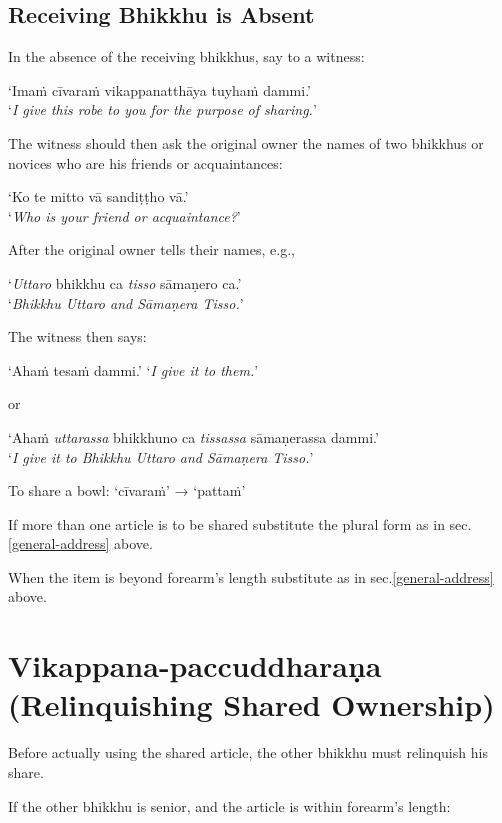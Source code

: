 
\subsection{Receiving Bhikkhu is Absent}
\label{receiving-bhikkhu-absent}

In the absence of the receiving bhikkhus, say to a witness:

‘Imaṁ cīvaraṁ vikappanatthāya tuyhaṁ dammi.’\\
‘\emph{I give this robe to you for the purpose of sharing.}’

The witness should then ask the original owner the names of two bhikkhus or
novices who are his friends or acquaintances:

‘Ko te mitto vā sandiṭṭho vā.’\\
‘\emph{Who is your friend or acquaintance?}’

\ifhandbookedition
\clearpage
\fi

After the original owner tells their names, e.g.,

‘\emph{Uttaro} bhikkhu ca \emph{tisso} sāmaṇero ca.’\\
‘\emph{Bhikkhu Uttaro and Sāmaṇera Tisso.}’

The witness then says:

‘Ahaṁ tesaṁ dammi.’ ‘\emph{I give it to them.}’

or

‘Ahaṁ \emph{uttarassa} bhikkhuno ca \emph{tissassa} sāmaṇerassa dammi.’\\
‘\emph{I give it to Bhikkhu Uttaro and Sāmaṇera Tisso.}’


To share a bowl: ‘cīvaraṁ’ → ‘pattaṁ’

If more than one article is to be shared substitute the plural form as in sec.\ref{general-address} above.

When the item is beyond forearm's length substitute as in sec.\ref{general-address} above.

\section[Vikappana-paccuddharaṇa (Relinquishing)]{Vikappana-paccuddharaṇa (Relinquishing Shared Ownership)}

Before actually using the shared article, the other bhikkhu must relinquish his
share.

If the other bhikkhu is senior, and the article is within forearm's length:

